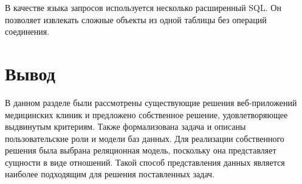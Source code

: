 В качестве языка запросов используется несколько расширенный SQL. 
Он позволяет извлекать сложные объекты из одной таблицы без операций соединения.





\section*{Вывод}
В данном разделе были рассмотрены существующие решения веб-приложений медицинских клиник и предложено собственное решение, удовлетворяющее выдвинутым критериям. 
Также формализована задача и описаны пользовательские роли и модели баз данных.
Для реализации собственного решения была выбрана реляционная модель, поскольку она представляет сущности в виде отношений. 
Такой способ представления данных является наиболее подходящим для решения поставленных задач.
